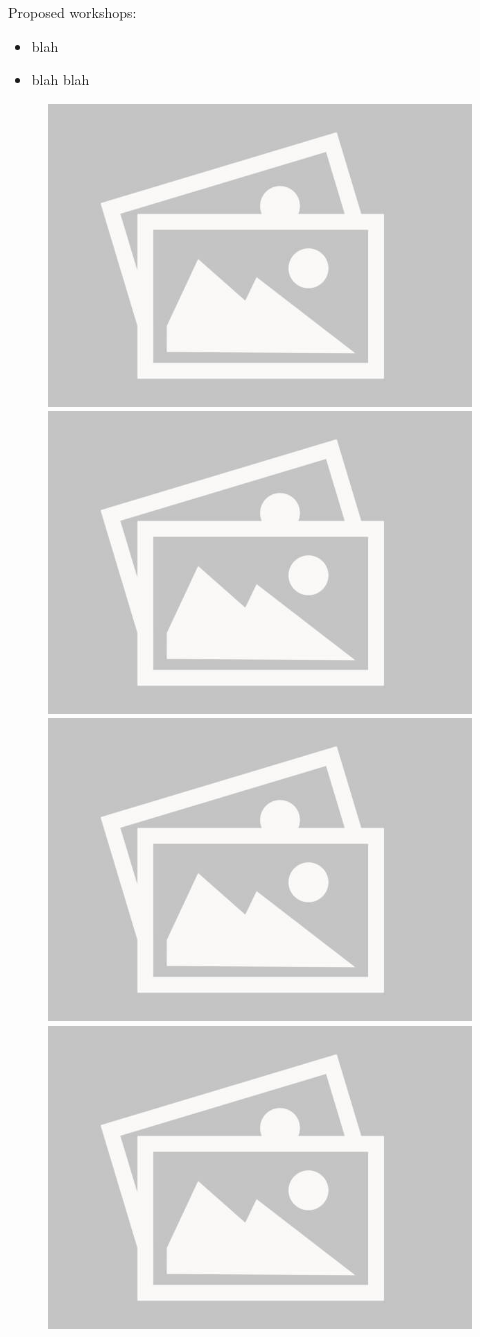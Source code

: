 \documentclass[a4paper,12pt]{report}
\begin{document}
Proposed workshops:

\begin{itemize}
    \item blah
    \item blah blah
\end{itemize}

\begin{figure}[H]
    \centering
    \includegraphics[width=0.42\linewidth]{./photos/placeholder.jpg}
    \includegraphics[width=0.42\linewidth]{./photos/placeholder.jpg}
    \includegraphics[width=0.42\linewidth]{./photos/placeholder.jpg}
    \includegraphics[width=0.42\linewidth]{./photos/placeholder.jpg}
\end{figure}


\newpage
\end{document}

